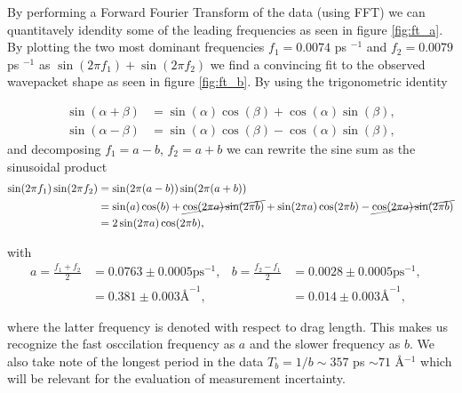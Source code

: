 By performing a Forward Fourier Transform of the data (using FFT) we can quantitavely idendity some of the leading frequencies as seen in figure \ref{fig:ft_a}. By plotting the two most dominant frequencies $f_1 = 0.0074$ ps $^{-1}$ and $f_2 = 0.0079$ ps $^{-1}$ as $\sin{(2\pi f_1)} + \sin{(2\pi f_2)}$ we find a convincing fit to the observed wavepacket shape as seen in figure \ref{fig:ft_b}. By using the trigonometric identity

\begin{align*}
\sin (\alpha+\beta) &= \sin (\alpha) \cos (\beta) + \cos (\alpha) \sin (\beta), \\
\sin (\alpha-\beta) &= \sin (\alpha) \cos (\beta) - \cos (\alpha) \sin (\beta),
\end{align*}
and decomposing $f_1 = a - b$, $f_2 = a + b$ we can rewrite the sine sum as the sinusoidal product
\begin{align*}
  \sin(2\pi f_1) \sin(2\pi f_2) &= \sin(2\pi (a - b)) \sin(2\pi (a + b)) \\
  &= \sin(a)\cos(b) + \cancel{\cos(2\pi a)\sin(2\pi b)} + \sin(2\pi a)\cos(2\pi b) - \cancel{\cos(2\pi a)\sin(2\pi b)} \\
  &= 2 \sin(2\pi a) \cos(2\pi b),
\end{align*} 

with 
\begin{align*}
  a = \frac{f_1 + f_2}{2} &= 0.0763 \pm 0.0005 \text{ps}^{-1},& 
  b = \frac{f_2 - f_1}{2} &= 0.0028 \pm 0.0005 \text{ps}^{-1},& \\
  &= 0.381 \pm 0.003 \text{Å}^{-1},& 
  &= 0.014 \pm 0.003 \text{Å}^{-1},& 
\end{align*}

where the latter frequency is denoted with respect to drag length. This makes us recognize the fast osccilation frequency as $a$ and the slower frequency as $b$. We also take note of the longest period in the data $T_b = 1/b \sim 357$ ps $\sim 71$ Å$^{-1}$ which will be relevant for the evaluation of measurement incertainty.



